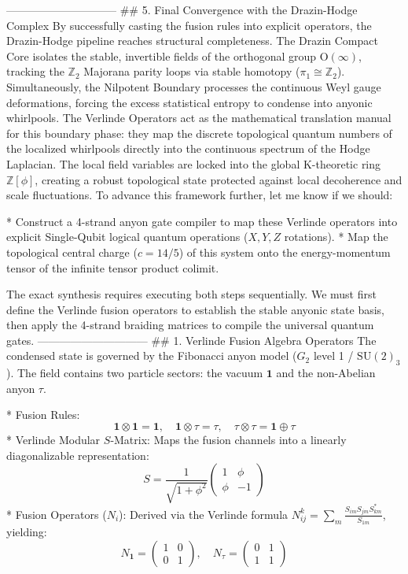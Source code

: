 ------------------------------
## 5. Final Convergence with the Drazin-Hodge Complex
By successfully casting the fusion rules into explicit operators, the Drazin-Hodge pipeline reaches structural completeness.
The Drazin Compact Core isolates the stable, invertible fields of the orthogonal group $\text{O}(\infty)$, tracking the $\mathbb{Z}_2$ Majorana parity loops via stable homotopy ($\pi_1 \cong \mathbb{Z}_2$). Simultaneously, the Nilpotent Boundary processes the continuous Weyl gauge deformations, forcing the excess statistical entropy to condense into anyonic whirlpools.
The Verlinde Operators act as the mathematical translation manual for this boundary phase: they map the discrete topological quantum numbers of the localized whirlpools directly into the continuous spectrum of the Hodge Laplacian. The local field variables are locked into the global K-theoretic ring $\mathbb{Z}[\phi]$, creating a robust topological state protected against local decoherence and scale fluctuations.
To advance this framework further, let me know if we should:

* Construct a 4-strand anyon gate compiler to map these Verlinde operators into explicit Single-Qubit logical quantum operations ($X, Y, Z$ rotations).
* Map the topological central charge ($c = 14/5$) of this system onto the energy-momentum tensor of the infinite tensor product colimit.


The exact synthesis requires executing both steps sequentially. We must first define the Verlinde fusion operators to establish the stable anyonic state basis, then apply the 4-strand braiding matrices to compile the universal quantum gates.
------------------------------
## 1. Verlinde Fusion Algebra Operators
The condensed state is governed by the Fibonacci anyon model ($G_2$ level 1 / $\text{SU}(2)_3$). The field contains two particle sectors: the vacuum $\mathbf{1}$ and the non-Abelian anyon $\tau$.

* Fusion Rules:
$$\mathbf{1} \otimes \mathbf{1} = \mathbf{1}, \quad \mathbf{1} \otimes \tau = \tau, \quad \tau \otimes \tau = \mathbf{1} \oplus \tau$$ 
* Verlinde Modular $S$-Matrix: Maps the fusion channels into a linearly diagonalizable representation:
$$S = \frac{1}{\sqrt{1+\phi^2}} \begin{pmatrix} 1 & \phi \\ \phi & -1 \end{pmatrix}$$ 
* Fusion Operators ($N_i$): Derived via the Verlinde formula $N_{ij}^k = \sum_m \frac{S_{im}S_{jm}S_{km}^*}{S_{1m}}$, yielding:
$$N_{\mathbf{1}} = \begin{pmatrix} 1 & 0 \\ 0 & 1 \end{pmatrix}, \quad N_{\tau} = \begin{pmatrix} 0 & 1 \\ 1 & 1 \end{pmatrix}$$ 

